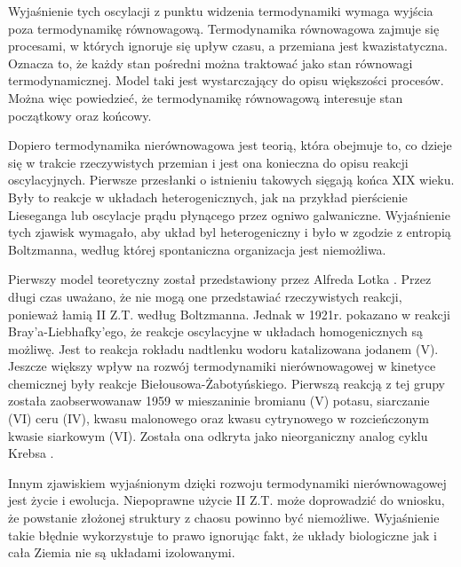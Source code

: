 \documentclass[10pt, a4paper, twoside, onecolumn]{article}
\numberwithin{equation}{section}
\begin{document}
	Wyjaśnienie tych oscylacji z punktu widzenia termodynamiki wymaga wyjścia poza termodynamikę równowagową. Termodynamika równowagowa zajmuje się procesami, w których ignoruje się upływ czasu, a przemiana jest kwazistatyczna. Oznacza to, że każdy stan pośredni można traktować jako stan równowagi termodynamicznej. Model taki jest wystarczający do opisu większości procesów. Można więc powiedzieć, że termodynamikę równowagową interesuje stan początkowy oraz końcowy. \par
	Dopiero termodynamika nierównowagowa jest teorią, która obejmuje to, co dzieje się w trakcie rzeczywistych przemian i jest ona konieczna do opisu reakcji oscylacyjnych. Pierwsze przesłanki o istnieniu takowych sięgają końca XIX wieku. Były to reakcje w układach heterogenicznych, jak na przykład pierścienie Lieseganga lub oscylacje prądu płynącego przez ogniwo galwaniczne. Wyjaśnienie tych zjawisk wymagało, aby układ byl heterogeniczny i było w zgodzie z entropią Boltzmanna, według której spontaniczna organizacja jest niemożliwa. \cite{orlik}\par
	Pierwszy model teoretyczny został przedstawiony przez Alfreda Lotka \cite{lotka}. Przez długi czas uważano, że nie mogą one przedstawiać rzeczywistych reakcji, ponieważ łamią II Z.T. według Boltzmanna. Jednak w 1921r. pokazano w reakcji Bray'a-Liebhafky'ego, że reakcje oscylacyjne w układach homogenicznych są możliwę. Jest to reakcja rokładu nadtlenku wodoru katalizowana jodanem (V). Jeszcze większy wpływ na rozwój termodynamiki nierównowagowej w kinetyce chemicznej były reakcje Biełousowa-Żabotyńskiego. Pierwszą reakcją z tej grupy została zaobserwowanaw 1959 w mieszaninie bromianu (V) potasu, siarczanie (VI) ceru (IV), kwasu malonowego oraz kwasu cytrynowego w rozcieńczonym kwasie siarkowym (VI). Została ona odkryta jako nieorganiczny analog cyklu Krebsa \cite{belousov_hist}. \par
	Innym zjawiskiem wyjaśnionym dzięki rozwoju termodynamiki nierównowagowej jest życie i ewolucja. Niepoprawne użycie II Z.T. może doprowadzić do wniosku, że powstanie złożonej struktury z chaosu powinno być niemożliwe. Wyjaśnienie takie błędnie wykorzystuje to prawo ignorując fakt, że układy biologiczne jak i cała Ziemia nie są układami izolowanymi. 
	
\end{document}
